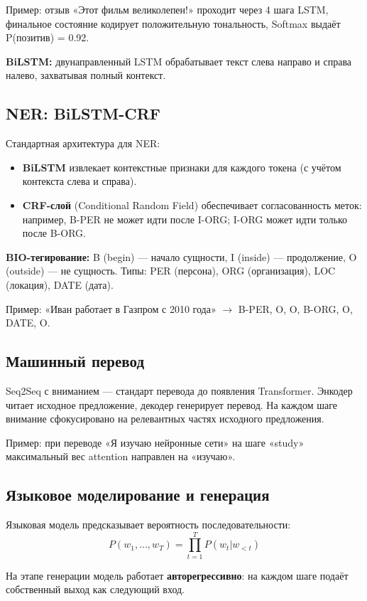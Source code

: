 \documentclass[a4paper,12pt]{article}
\begin{document}
Пример: отзыв «Этот фильм великолепен!» проходит через 4 шага LSTM, финальное состояние кодирует положительную тональность, Softmax выдаёт P(позитив) = 0.92.

\textbf{BiLSTM:} двунаправленный LSTM обрабатывает текст слева направо и справа налево, захватывая полный контекст.

\subsection{NER: BiLSTM-CRF}

Стандартная архитектура для NER:
\begin{itemize}
    \item \textbf{BiLSTM} извлекает контекстные признаки для каждого токена (с учётом контекста слева и справа).
    \item \textbf{CRF-слой} (Conditional Random Field) обеспечивает согласованность меток: например, B-PER не может идти после I-ORG; I-ORG может идти только после B-ORG.
\end{itemize}

\textbf{BIO-тегирование:} B (begin) — начало сущности, I (inside) — продолжение, O (outside) — не сущность. Типы: PER (персона), ORG (организация), LOC (локация), DATE (дата).

Пример: «Иван работает в Газпром с 2010 года» $\to$ B-PER, O, O, B-ORG, O, DATE, O.

\subsection{Машинный перевод}

Seq2Seq с вниманием — стандарт перевода до появления Transformer. Энкодер читает исходное предложение, декодер генерирует перевод. На каждом шаге внимание сфокусировано на релевантных частях исходного предложения.

Пример: при переводе «Я изучаю нейронные сети» на шаге «study» максимальный вес attention направлен на «изучаю».

\subsection{Языковое моделирование и генерация}

Языковая модель предсказывает вероятность последовательности:
\[
P(w_1, \dots, w_T) = \prod_{t=1}^{T} P(w_t | w_{<t})
\]

На этапе генерации модель работает \textbf{авторегрессивно}: на каждом шаге подаёт собственный выход как следующий вход.
\end{document}
